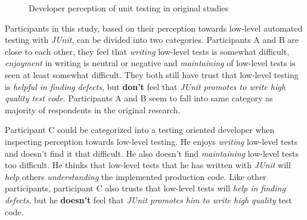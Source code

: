     \begin{figure}[ht]%
        \centering
        \qquad
        \caption{Developer perception of unit testing in original studies}%
        \label{fig:org-perception-two}%
    \end{figure}

Participants in this study, based on their perception towards low-level automated testing with \textit{JUnit}, can be divided into
two categories. Participants A and B are close to each other, they feel that
\textit{writing} low-level tests is somewhat difficult, \textit{enjoyment} in writing is neutral or negative and \textit{maintaining}
of low-level tests is seen at least somewhat difficult. They both still have trust that low-level testing is \textit{helpful in
finding defects}, but \textbf{don't} feel that \textit{JUnit} \textit{promotes to write high quality test code}. Participants
A and B seem to fall into same category as majority of respondents in the original research.

Participant C could be categorized into a testing oriented developer when inspecting perception towards
low-level testing. He enjoys \textit{writing} low-level tests and doesn't find it that difficult. He also doesn't find
\textit{maintaining} low-level tests too difficult. He thinks that low-level tests that he has written with \textit{JUnit} will \textit{help} others \textit{understanding}
the implemented production code. Like other participants, participant C also trusts that low-level
tests will \textit{help in finding defects}, but he \textbf{doesn't} feel that \textit{JUnit} \textit{promotes him to write high quality} test code.

